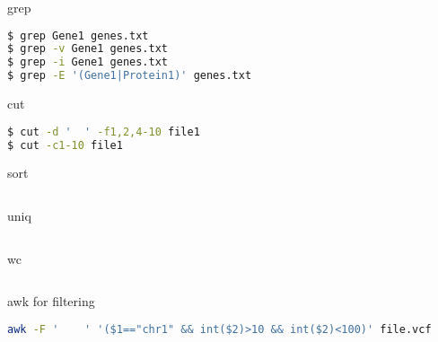 \documentclass{beamer}
\begin{document}
\begin{frame}[fragile]
 \begin{center}
    \huge{grep}\\
    \end{center}
\begin{lstlisting}[language=bash]
$ grep Gene1 genes.txt
$ grep -v Gene1 genes.txt
$ grep -i Gene1 genes.txt
$ grep -E '(Gene1|Protein1)' genes.txt
\end{lstlisting}
\end{frame}


\begin{frame}[fragile]
 \begin{center}
    \huge{cut}\\
    \end{center}
\begin{lstlisting}[language=bash]
$ cut -d '	' -f1,2,4-10 file1
$ cut -c1-10 file1
\end{lstlisting}
\end{frame}

\begin{frame}[fragile]
 \begin{center}
    \huge{sort}\\
    \end{center}
\begin{lstlisting}[language=bash]

\end{lstlisting}
\end{frame}


\begin{frame}[fragile]
 \begin{center}
    \huge{uniq}\\
    \end{center}
\begin{lstlisting}[language=bash]

\end{lstlisting}
\end{frame}


\begin{frame}[fragile]
 \begin{center}
    \huge{wc}\\
    \end{center}
\begin{lstlisting}[language=bash]

\end{lstlisting}
\end{frame}


\begin{frame}[fragile]
 \begin{center}
    \huge{awk for filtering}\\
    \end{center}
\begin{lstlisting}[language=bash]
awk -F '	' '($1=="chr1" && int($2)>10 && int($2)<100)' file.vcf
\end{lstlisting}
\end{frame}
\end{document}
